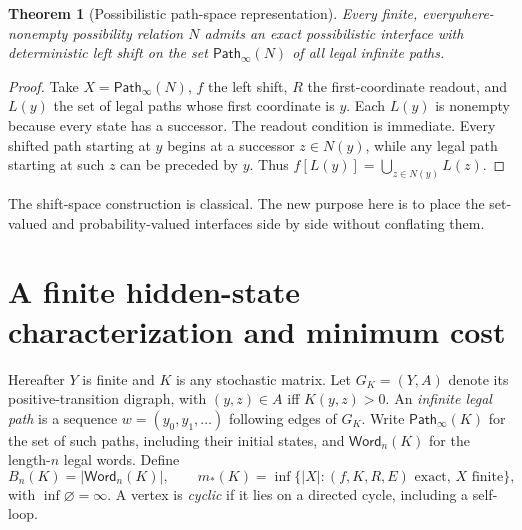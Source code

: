 \documentclass[11pt,letterpaper]{article}
\newtheorem{theorem}{Theorem}[section]
\theoremstyle{definition}\newtheorem{definition}[theorem]{Definition}
\theoremstyle{remark}\newtheorem{remark}[theorem]{Remark}
\newcommand{\Paths}{\mathsf{Path}}
\newcommand{\Words}{\mathsf{Word}}
\begin{document}
\begin{theorem}[Possibilistic path-space representation]\label{thm:poss-path}
Every finite, everywhere-nonempty possibility relation $N$ admits an exact possibilistic interface with deterministic left shift on the set $\Paths_\infty(N)$ of all legal infinite paths.
\end{theorem}
\begin{proof}
Take $X=\Paths_\infty(N)$, $f$ the left shift, $R$ the first-coordinate readout, and $L(y)$ the set of legal paths whose first coordinate is $y$. Each $L(y)$ is nonempty because every state has a successor. The readout condition is immediate. Every shifted path starting at $y$ begins at a successor $z\in N(y)$, while any legal path starting at such $z$ can be preceded by $y$. Thus $f[L(y)]=\bigcup_{z\in N(y)}L(z)$.
\end{proof}
The shift-space construction is classical. The new purpose here is to place the set-valued and probability-valued interfaces side by side without conflating them.

\section{A finite hidden-state characterization and minimum cost}
Hereafter $Y$ is finite and $K$ is any stochastic matrix. Let $G_K=(Y,A)$ denote its positive-transition digraph, with $(y,z)\in A$ iff $K(y,z)>0$. An \emph{infinite legal path} is a sequence $w=(y_0,y_1,\ldots)$ following edges of $G_K$. Write $\Paths_\infty(K)$ for the set of such paths, including their initial states, and $\Words_n(K)$ for the length-$n$ legal words. Define
\[
B_n(K)=|\Words_n(K)|,\qquad m_*(K)=\inf\{|X|:(f,K,R,E)\text{ exact, }X\text{ finite}\},
\]
with $\inf\varnothing=\infty$. A vertex is \emph{cyclic} if it lies on a directed cycle, including a self-loop.
\end{document}
